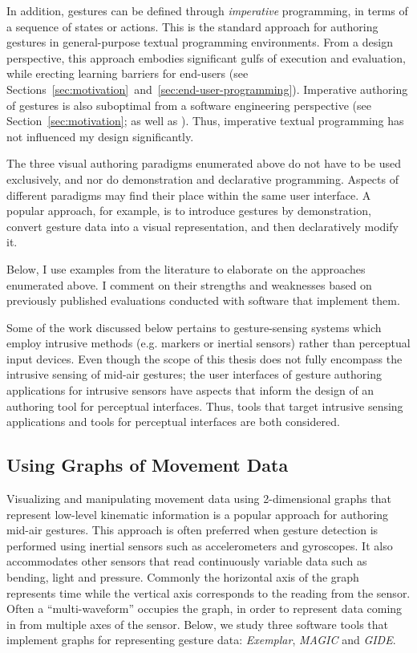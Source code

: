 In addition, gestures can be defined through \emph{imperative} programming, in terms of a sequence of states or actions. This is the standard approach for authoring gestures in general-purpose textual programming environments. From a design perspective, this approach embodies significant gulfs of execution and evaluation, while erecting learning barriers for end-users (see Sections~\ref{sec:motivation}~and~\ref{sec:end-user-programming}). Imperative authoring of gestures is also suboptimal from a software engineering perspective (see Section~\ref{sec:motivation}; as well as \textcite{Hoste:2014}). Thus, imperative textual programming has not influenced my design significantly.

The three visual authoring paradigms enumerated above do not have to be used exclusively, and nor do demonstration and declarative programming. Aspects of different paradigms may find their place within the same user interface. A popular approach, for example, is to introduce gestures by demonstration, convert gesture data into a visual representation, and then declaratively modify it.

Below, I use examples from the literature to elaborate on the approaches enumerated above. I comment on their strengths and weaknesses based on previously published evaluations conducted with software that implement them.

Some of the work discussed below pertains to gesture-sensing systems which employ intrusive methods (e.g. markers or inertial sensors) rather than perceptual input devices. Even though the scope of this thesis does not fully encompass the intrusive sensing of mid-air gestures; the user interfaces of gesture authoring applications for intrusive sensors have aspects that inform the design of an authoring tool for perceptual interfaces. Thus, tools that target intrusive sensing applications and tools for perceptual interfaces are both considered.

\subsection{Using Graphs of Movement Data}

Visualizing and manipulating movement data using 2-dimensional graphs that represent low-level kinematic information is a popular approach for authoring mid-air gestures. This approach is often preferred when gesture detection is performed using inertial sensors such as accelerometers and gyroscopes. It also accommodates other sensors that read continuously variable data such as bending, light and pressure. Commonly the horizontal axis of the graph represents time while the vertical axis corresponds to the reading from the sensor. Often a “multi-waveform” occupies the graph, in order to represent data coming in from multiple axes of the sensor. Below, we study three software tools that implement graphs for representing gesture data: \emph{Exemplar}, \emph{MAGIC} and \emph{GIDE}.

